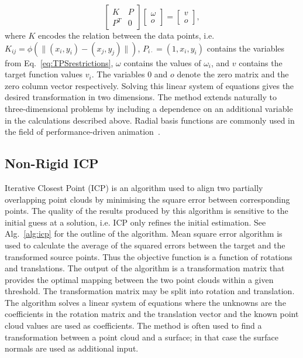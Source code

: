 \begin{equation}
\begin{bmatrix}
	K & P \\
	P^T & 0 
\end{bmatrix} 
\begin{bmatrix}
	\omega \\
	o
\end{bmatrix} = 
\begin{bmatrix}
	v \\
	o
\end{bmatrix}, 
\end{equation} where $K$ encodes the relation between the data points, i.e. $K_{ij} = \phi(\|(x_i,y_i) - (x_j,y_j)\|)$, $P_{i\cdot} = (1, x_i, y_i)$ contains the variables from Eq.~\ref{eq:TPSrestrictions}, $\omega$ contains the values of $\omega_i$, and $v$ contains the target function values $v_i$. The variables $0$ and $o$ denote the zero matrix and the zero column vector respectively. Solving this linear system of equations gives the desired transformation in two dimensions. The method extends naturally to three-dimensional problems by including a dependence on an additional variable in the calculations described above. Radial basis functions are commonly used in the field of performance-driven animation~\cite{Joshi:2003}.

\subsection{Non-Rigid ICP}
Iterative Closest Point (ICP) is an algorithm used to align two partially overlapping point clouds by minimising the square error between corresponding points. The quality of the results produced by this algorithm is sensitive to the initial guess at a solution, i.e. ICP only refines the initial estimation. See Alg.~\ref{alg:icp} for the outline of the algorithm. Mean square error algorithm is used to calculate the average of the squared errors between the target and the transformed source points. Thus the objective function is a function of rotations and translations. The output of the algorithm is a transformation matrix that provides the optimal mapping between the two point clouds within a given threshold. The transformation matrix may be split into rotation and translation. The algorithm solves a linear system of equations where the unknowns are the coefficients in the rotation matrix and the translation vector and the known point cloud values are used as coefficients. The method is often used to find a transformation between a point cloud and a surface; in that case the surface normals are used as additional input.

